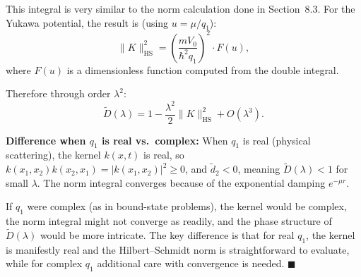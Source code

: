 \documentclass[12pt]{article}
\begin{document}
This integral is very similar to the norm calculation done in Section~8.3. For the Yukawa potential, the result is (using $u = \mu/q_1$):
\[
\|K\|_{\text{HS}}^2 = \left(\frac{mV_0}{\hbar^2 q_1}\right)^2 \cdot F(u),
\]
where $F(u)$ is a dimensionless function computed from the double integral.

Therefore through order $\lambda^2$:
\[
\boxed{\tilde{D}(\lambda) = 1 - \frac{\lambda^2}{2}\|K\|_{\text{HS}}^2 + O(\lambda^3)}.
\]

\textbf{Difference when $q_1$ is real vs.\ complex:} When $q_1$ is real (physical scattering), the kernel $k(x,t)$ is real, so $k(x_1,x_2)k(x_2,x_1) = |k(x_1,x_2)|^2 \ge 0$, and $\tilde{d}_2 < 0$, meaning $\tilde{D}(\lambda) < 1$ for small $\lambda$. The norm integral converges because of the exponential damping $e^{-\mu r}$.

If $q_1$ were complex (as in bound-state problems), the kernel would be complex, the norm integral might not converge as readily, and the phase structure of $\tilde{D}(\lambda)$ would be more intricate. The key difference is that for real $q_1$, the kernel is manifestly real and the Hilbert--Schmidt norm is straightforward to evaluate, while for complex $q_1$ additional care with convergence is needed. \hfill $\blacksquare$
\end{document}
